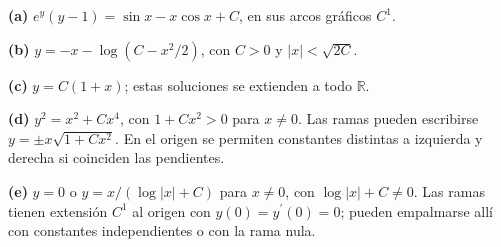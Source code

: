 \noindent\textbf{(a)} $e^y(y-1)=\sin x-x\cos x+C$, en sus arcos gráficos $C^1$.

\noindent\textbf{(b)} $y=-x-\log(C-x^2/2)$, con $C>0$ y $|x|<\sqrt{2C}$.

\noindent\textbf{(c)} $y=C(1+x)$; estas soluciones se extienden a todo $\mathbb R$.

\noindent\textbf{(d)} $y^2=x^2+Cx^4$, con $1+Cx^2>0$ para $x\ne0$. Las ramas pueden escribirse $y=\pm x\sqrt{1+Cx^2}$. En el origen se permiten constantes distintas a izquierda y derecha si coinciden las pendientes.

\noindent\textbf{(e)} $y=0$ o $y=x/(\log|x|+C)$ para $x\ne0$, con $\log|x|+C\ne0$. Las ramas tienen extensión $C^1$ al origen con $y(0)=y^{\prime}(0)=0$; pueden empalmarse allí con constantes independientes o con la rama nula.
